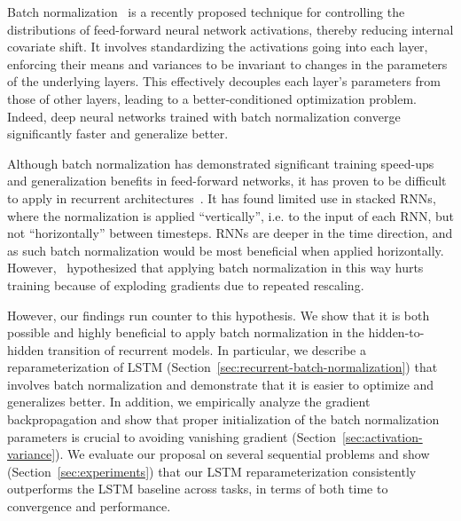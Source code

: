 \documentclass{article} %
\begin{document}
Batch normalization~\citep{batchnorm} is a recently proposed technique for controlling the distributions of feed-forward neural network activations, thereby reducing internal covariate shift.
It involves standardizing the activations going into each layer, enforcing their means and variances to be invariant to changes in the parameters of the underlying layers.
This effectively decouples each layer's parameters from those of other layers, leading to a better-conditioned optimization problem.
Indeed, deep neural networks trained with batch normalization converge significantly faster and generalize better.

Although batch normalization has demonstrated significant training speed-ups and generalization benefits in feed-forward networks,
it has proven to be difficult to apply in recurrent architectures~\citep{cesar,baidu}.
It has found limited use in stacked RNNs, where the normalization is applied ``vertically'',
i.e. to the input of each RNN, but not ``horizontally'' between timesteps.
RNNs are deeper in the time direction, and as such batch normalization would be most beneficial when applied horizontally.
However,~\citet{cesar} hypothesized that applying batch normalization in this way hurts training
because of exploding gradients due to repeated rescaling.

However, our findings run counter to this hypothesis.
We show that it is both possible and highly beneficial to apply batch normalization in the hidden-to-hidden transition of recurrent models.
In particular, we describe a reparameterization of LSTM (Section~\ref{sec:recurrent-batch-normalization}) that involves batch normalization
and demonstrate that it is easier to optimize and generalizes better.
In addition, we empirically analyze the gradient backpropagation and show that proper initialization
of the batch normalization parameters is crucial to avoiding vanishing gradient (Section~\ref{sec:activation-variance}).
We evaluate our proposal on several sequential problems and show (Section~\ref{sec:experiments}) that our
LSTM reparameterization consistently outperforms the LSTM baseline across tasks,
in terms of both time to convergence and performance.
\end{document}
